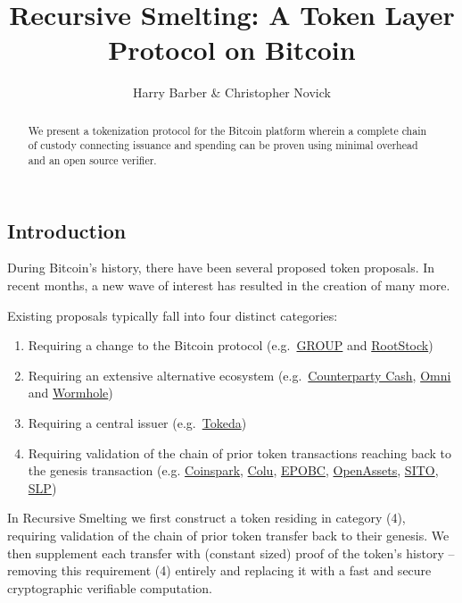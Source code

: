\documentclass[9pt,oneside]{amsart}
\title{Recursive Smelting: A Token Layer Protocol on Bitcoin}
\author{Harry Barber \& Christopher Novick}
\begin{document}
\begin{abstract}
    We present a tokenization protocol for the Bitcoin platform wherein a complete chain of custody connecting issuance and spending can be proven using minimal overhead and an open source verifier.
\end{abstract}
\maketitle
\begin{multicols}{2}
	

\section{Introduction}
During Bitcoin's history, there have been several proposed token proposals. In recent months, a new wave of interest has resulted in the creation of many more. 

Existing proposals typically fall into four distinct categories: \begin{enumerate}
    \item Requiring a change to the Bitcoin protocol (e.g.\ \href{https://docs.google.com/document/d/1X-yrqBJNj6oGPku49krZqTMGNNEWnUJBRFjX7fJXvTs}{GROUP} and \href{https://en.wikipedia.org/wiki/RootStock}{RootStock})
    \item Requiring an extensive alternative ecosystem (e.g.\ \href{https://counterparty.io/docs/protocol_specification/}{Counterparty Cash}, \href{https://github.com/OmniLayer/spec}{Omni} and \href{http://wormhole.cash}{Wormhole})
    \item Requiring a central issuer (e.g.\ \href{http://media.lokad.com/bitcoin/tokeda-2018-04-30.pdf}{Tokeda})
    \item Requiring validation of the chain of prior token transactions reaching back to the genesis transaction (e.g.
    \href{http://coinspark.org/}{Coinspark},
    \href{https://github.com/Colored-Coins/Colored-Coins-Protocol-Specification}{Colu},
    \href{https://github.com/chromaway/ngcccbase/wiki/EPOBC_simple}{EPOBC},
	\href{https://github.com/OpenAssets/open-assets-protocol/blob/master/specification.mediawiki}{OpenAssets},
   \href{https://github.com/awemany/sito}{SITO},
     \href{https://github.com/simpleledger/simple-ledger-protocol}{SLP})
\end{enumerate}

In Recursive Smelting we first construct a token residing in category (4), requiring validation of the chain of prior token transfer back to their genesis. We then supplement each transfer with (constant sized) proof of the token's history -- removing this requirement (4) entirely and replacing it with a fast and secure cryptographic verifiable computation.


\end{multicols}
\end{document}
